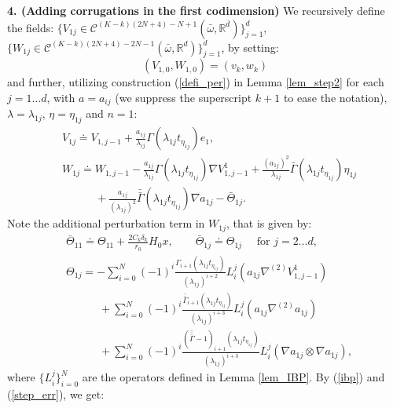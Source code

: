 \documentclass[reqno,twoside,11pt]{amsart}
\newcommand{\R}{\mathbb{R}}
\newcommand*{\dbar}[1]{\bar{\bar{#1}}}
\newcommand*{\tbar}[1]{\bar{\dbar{#1}}}
\numberwithin{equation}{section}
\theoremstyle{plain}
\theoremstyle{definition}
\begin{document}
{\bf 4. (Adding corrugations in the first codimension)} 
We recursively define the fields: 
$\{V_{1j}\in\mathcal{C}^{(K-k)(2N+4)-N+1}(\bar\omega,\R^{\bar d})\}_{j=1}^d$,
$\{W_{1j}\in\mathcal{C}^{(K-k)(2N+4)-2N-1}(\bar\omega,\R^{d})\}_{j=1}^d$,  by setting:
$$(V_{1,0}, W_{1,0}) = (v_k, w_k)$$
and further, utilizing construction (\ref{defi_per}) in Lemma \ref{lem_step2} for each $j=1\ldots d$,
with $a=a_{ij}$ (we suppress the superscript $k+1$ to ease the
notation), $\lambda = \lambda_{1j}$, $\eta=\eta_{1j}$ and $n=1$:
\begin{equation}\label{VW1}
\begin{split}
& V_{1j}\doteq V_{1,j-1}+\frac{a_{1j}}{\lambda_{ij}}\Gamma(\lambda_{1j}t_{\eta_{1j}})e_1,
\\ & W_{1j} \doteq W_{1,j-1} - \frac{a_{1j}}{\lambda_{1j}} \Gamma(\lambda_{1j} t_{\eta_{1j}})\nabla V^1_{1,j-1}
+ \frac{(a_{1j})^2}{\lambda_{1j}} \bar\Gamma(\lambda_{1j}
t_{\eta_{1j}})\eta_{1j} \\ &\qquad \quad+ 
\frac{a_{1j}}{(\lambda_{1j})^2} \dbar \Gamma(\lambda_{1j}
t_{\eta_{1j}})\nabla a_{1j} - \bar\Theta_{1j}.
\end{split}
\end{equation}
Note the additional perturbation term in $W_{1j}$, that is given by:
\begin{equation}\label{omega1}
\begin{split}
& \bar\Theta_{11} \doteq \Theta_{11} + \frac{2C_k\delta_k}{r_0}H_0x, \qquad 
\bar\Theta_{1j} \doteq \Theta_{1j} \quad\mbox{ for } j=2\ldots d,
\\ & \Theta_{1j} = -\sum_{i=0}^N (-1)^i \frac{\Gamma_{i+1}(\lambda_{1j}t_{\eta_{1j}})}{(\lambda_{1j})^{i+2}} 
L_i^j(a_{1j}\nabla^{(2)}V_{1,{j-1}}^1) \\ & \qquad\quad +  \sum_{i=0}^N (-1)^i
\frac{\dbar\Gamma_{i+1}(\lambda_{1j}t_{\eta_{1j}})}{(\lambda_{1j})^{i+3}}  
L_i^j(a_{1j}\nabla^{(2)} a_{1j}) \\ & \qquad\quad + \sum_{i=0}^N (-1)^i
\frac{(\tbar\Gamma-1)_{i+1}(\lambda_{1j}t_{\eta_{1j}})}{(\lambda_{1j})^{i+3}}  
L_i^j(\nabla a_{1j}\otimes \nabla a_{1j}),
\end{split}
\end{equation}
where $\{L_i^j\}_{i=0}^N$ are the operators defined in Lemma \ref{lem_IBP}.
By (\ref{ibp}) and (\ref{step_err}), we get:
\end{document}

